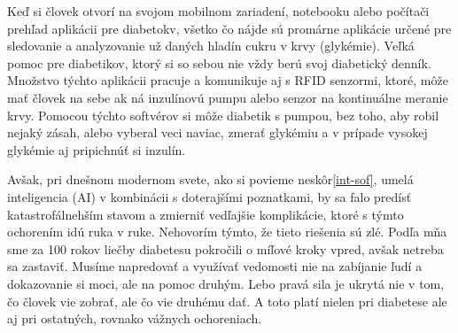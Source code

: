 Keď si človek otvorí na svojom mobilnom zariadení, notebooku alebo počítači prehľad aplikácii pre diabetokv, všetko čo nájde sú promárne aplikácie určené pre sledovanie a analyzovanie už daných hladín cukru v krvy (glykémie).
Veľká pomoc pre diabetikov, ktorý si so sebou nie vždy berú svoj diabetický denník. Množstvo týchto aplikácii pracuje a komunikuje aj s RFID senzormi, ktoré, môže mať človek na sebe ak ná inzulínovú pumpu alebo senzor na kontinuálne meranie krvy. 
Pomocou týchto softvérov si môže diabetik s pumpou, bez toho, aby robil nejaký zásah, alebo vyberal veci naviac, zmerať glykémiu a v prípade vysokej glykémie aj pripichnúť si inzulín.

Avšak, pri dnešnom modernom svete, ako si povieme neskôr\ref{int-sof}, umelá inteligencia (AI) v kombinácii s doterajšími poznatkami, by sa falo predísť katastrofálnehším stavom a zmierniť vedľajšie komplikácie, ktoré s týmto ochorením idú ruka v ruke.
Nehovorím týmto, že tieto riešenia sú zlé. Podľa mňa sme za 100 rokov liečby diabetesu pokročili o míľové kroky vpred, avšak netreba sa zastaviť. Musíme napredovať a využívať vedomosti nie na zabíjanie ľudí a dokazovanie si moci, ale na pomoc druhým. 
Lebo pravá sila je ukrytá nie v tom, čo človek vie zobrať, ale čo vie druhému dať. A toto platí nielen pri diabetese ale aj pri ostatných, rovnako vážnych ochoreniach. 